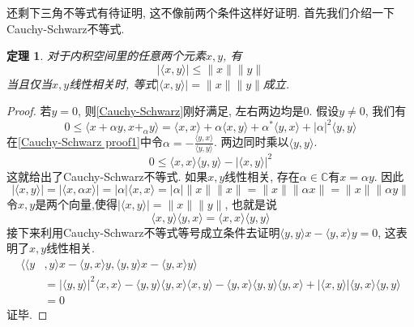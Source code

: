 \documentclass[a4paper,11pt]{book}
\newtheorem{theorem}{\hspace{2em}定理}[section]
\newtheorem{proof}{证明}[section]
\begin{document}
还剩下三角不等式有待证明, 这不像前两个条件这样好证明. 首先我们介绍一下Cauchy-Schwarz不等式.
\begin{theorem}
  对于内积空间里的任意两个元素$x,y$, 有
  \begin{equation}\label{Cauchy-Schwarz}
    |\langle x,y\rangle|\leq\|x\|\|y\|
  \end{equation}
  当且仅当$x,y$线性相关时, 等式$|\langle x,y\rangle|=\|x\|\|y\|$成立.
\end{theorem}
\begin{proof}
  若$y=0$, 则\eqref{Cauchy-Schwarz}刚好满足, 左右两边均是$0$. 假设$y\neq 0$, 我们有
  \begin{equation*}\label{Cauchy-Schwarz proof1}
    0\leq\langle x+\alpha y,x+_\alpha y\rangle=\langle x,x\rangle+\alpha\langle x,y\rangle+\alpha^*\langle y,x\rangle+|\alpha|^2\langle y,y\rangle
  \end{equation*}
  在\eqref{Cauchy-Schwarz proof1}中令$\alpha=-\frac{\langle y,x\rangle}{\langle y,y\rangle}$. 两边同时乘以$\langle y,y\rangle$.
  \begin{equation*}
    0\leq\langle x,x\rangle\langle y,y\rangle-|\langle x,y\rangle|^2
  \end{equation*}
  这就给出了Cauchy-Schwarz不等式. 如果$x,y$线性相关, 存在$\alpha\in \mathbb{C}$有$x=\alpha y$. 因此
  \begin{equation*}
    |\langle x,y\rangle|=|\langle x,\alpha x\rangle|=|\alpha|\langle x,x\rangle=|\alpha|\|x\|\|x\|=\|x\|\|\alpha x\|=\|x\|\|\alpha y\|
  \end{equation*}
  令$x,y$是两个向量,使得$|\langle x,y\rangle|=\|x\|\|y\|$, 也就是说
  \begin{equation*}
    \langle x,y\rangle\langle y,x\rangle=\langle x,x\rangle\langle y,y\rangle
  \end{equation*}
  接下来利用Cauchy-Schwarz不等式等号成立条件去证明$\langle y,y\rangle x-\langle y,x\rangle y=0$, 这表明了$x,y$线性相关.
  \begin{equation*}
  \begin{split}
     \langle\langle y&,y\rangle x-\langle y,x\rangle y,\langle y,y\rangle x-\langle y,x\rangle y\rangle \\
       & =|\langle y,y\rangle|^2\langle x,x\rangle-\langle y,y\rangle\langle y,x\rangle\langle x,y\rangle-\langle y,x\rangle\langle y,y\rangle\langle y,x\rangle+|\langle x,y\rangle|\langle y,x\rangle\langle y,y\rangle \\
       & =0
  \end{split}
  \end{equation*}
  证毕.
\end{proof}
\end{document}
